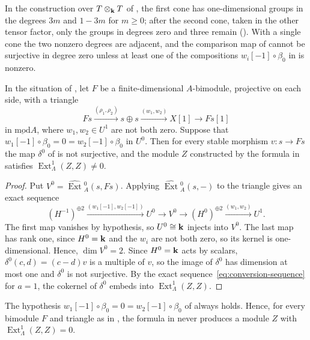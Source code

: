 In the construction over ${T\otimes_{\mathbf{k}} T}$ of , the first cone
has
one-dimensional groups in the degrees $3m$ and ${1-3m}$ for ${m\geq0}$; after the
second cone, taken in the other tensor factor, only the groups in degrees zero
and three remain (). With a single cone the two
nonzero degrees are
adjacent, and the comparison map of  cannot be surjective
in degree zero unless at least one of the compositions ${w_i[-1]\circ\beta_0}$ in
 is nonzero.

\begin{proposition}
  \label{prop:one-factor}
  In the situation of , let $F$ be a finite-dimen\-sional
  $A$-bimodule, projective on each side, with a triangle
  \[
    Fs\xrightarrow{(\rho_1,\rho_2)}s\oplus s\xrightarrow{(w_1,w_2)}X[1]
    \longrightarrow Fs[1]
  \]
  in $\operatorname{\underline{mod}}A$, where ${w_1,w_2\in U^1}$ are not both
  zero. Suppose that ${w_1[-1]\circ\beta_0}={0}={w_2[-1]\circ\beta_0}$ in $U^0$. Then
  for every stable morphism ${v\colon s\to Fs}$ the map $\delta^0$ of
   is not surjective, and the module $Z$ constructed by the
  formula in  satisfies
  ${\operatorname{Ext}^1_\Lambda(Z,Z)\neq0}$.
\end{proposition}

\begin{proof}
  Put ${V^0=\widehat{\operatorname{Ext}}{}^0_A(s,Fs)}$. Applying
  ${\widehat{\operatorname{Ext}}{}^0_A(s,-)}$ to the triangle gives an exact
  sequence
  \[
    (H^{-1})^{\oplus2}\xrightarrow{(w_1[-1],w_2[-1])}U^0\longrightarrow V^0
    \longrightarrow(H^0)^{\oplus2}\xrightarrow{(w_1,w_2)}U^1.
  \]
  The first map vanishes by hypothesis, so ${U^0\cong\mathbf{k}}$ injects into $V^0$.
  The last map has rank one, since ${H^0=\mathbf{k}}$ and the $w_i$ are not both zero,
  so its kernel is one-dimensional. Hence, ${\dim V^0=2}$. Since ${H^0=\mathbf{k}}$ acts by
  scalars, ${\delta^0(c,d)=(c-d)v}$ is a multiple of $v$, so the image of
  $\delta^0$ has dimension at most one and $\delta^0$ is not surjective. By the
  exact sequence~\eqref{eq:conversion-sequence} for ${a=1}$, the cokernel of
  $\delta^0$ embeds into $\operatorname{Ext}^1_\Lambda(Z,Z)$.
\end{proof}

\begin{corollary}
  \label{coro:one-factor}
  The hypothesis ${w_1[-1]\circ\beta_0=0=w_2[-1]\circ\beta_0}$ of
   always holds. Hence, for every bimodule $F$ and
  triangle as in , the formula in 
  never produces a module $Z$ with
  ${\operatorname{Ext}^1_\Lambda(Z,Z)=0}$.
\end{corollary}

